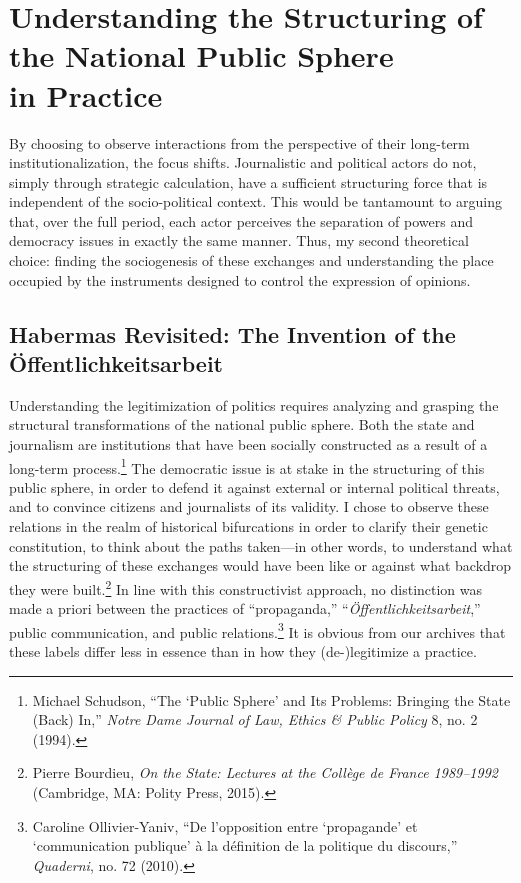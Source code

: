 \documentclass{tufte-handout}
\begin{document}
\hypertarget{understanding-the-structuring-of-the-national-public-sphere-in-practice}{%
\section{Understanding the Structuring of the National Public Sphere\\\noindent
in
Practice}\label{understanding-the-structuring-of-the-national-public-sphere-in-practice}}

By choosing to observe interactions from the perspective of their
long-term institutionalization, the focus shifts. Journalistic and
political actors do not, simply through strategic calculation, have a
sufficient structuring force that is independent of the socio-political
context. This would be tantamount to arguing that, over the full period,
each actor perceives the separation of powers and democracy issues in
exactly the same manner. Thus, my second theoretical choice: finding the
sociogenesis of these exchanges and understanding the place occupied by
the instruments designed to control the expression of opinions.

\hypertarget{habermas-revisited-the-invention-of-the-uxf6ffentlichkeitsarbeit}{%
\subsection{Habermas Revisited: The Invention
of the
Öffentlichkeitsarbeit}\label{habermas-revisited-the-invention-of-the-uxf6ffentlichkeitsarbeit}}

Understanding the legitimization of politics requires analyzing and
grasping the structural transformations of the national public sphere.
Both the state and journalism are institutions that have been socially
constructed as a result of a long-term process.\footnote{Michael
  Schudson, ``The `Public Sphere' and Its Problems: Bringing the State
  (Back) In,'' \emph{Notre Dame Journal of Law, Ethics \& Public Policy}
  8, no. 2 (1994).} The democratic issue is at stake in the structuring
of this public sphere, in order to defend it against external or
internal political threats, and to convince citizens and journalists of
its validity. I chose to observe these relations in the realm of
historical bifurcations in order to clarify their genetic constitution,
to think about the paths taken---in other words, to understand what the
structuring of these exchanges would have been like or against what
backdrop they were built.\footnote{Pierre Bourdieu, \emph{On the State:
  Lectures at the Collège de France 1989--1992} (Cambridge, MA: Polity
  Press, 2015).} In line with this constructivist approach, no
distinction was made a priori between the practices of ``propaganda,''
``\emph{Öffentlichkeitsarbeit},'' public communication, and public
relations.\footnote{Caroline Ollivier-Yaniv, ``De l'opposition entre
  `propagande' et `communication publique' à la définition de la
  politique du discours,'' \emph{Quaderni}, no. 72 (2010).} It is
obvious from our archives that these labels differ less in essence than
in how they (de-)legitimize a practice.
\end{document}
